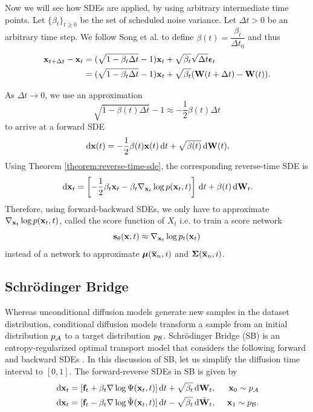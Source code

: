 Now we will see how SDEs are applied, by using arbitrary intermediate time points. Let $\{\beta_t\}_{t\ge0}$ be the set of scheduled noise variance.
Let $\Delta t>0$ be an arbitrary time step. We follow Song et al. \cite{song2020score} to define $\beta(t)=\dfrac{\beta_t}{\Delta t_0}$ and thus
\begin{align*}
 \mathbf{x}_{t+\Delta t}-\mathbf{x}_{t}
  & = (\sqrt{1-\beta_t\Delta t}-1)\mathbf{x}_{t}+\sqrt{\beta_t}\sqrt{\Delta t}\bm{\epsilon}_{t}       \\
  & =(\sqrt{1-\beta_t\Delta t}-1)\mathbf{x}_{t}+\sqrt{\beta_t}(\mathbf{W}(t+\Delta t)-\mathbf{W}(t)).
\end{align*}

As $\Delta t\to 0$, we use an approximation
\begin{equation}
 \sqrt{1-\beta(t)\Delta t} - 1\approx -\dfrac{1}{2}\beta(t)\Delta t
\end{equation}
to arrive at a forward SDE
\begin{equation}
 \label{equation:song-sde}
 \,\mathrm{d} \mathbf{x}(t)=-\dfrac{1}{2}\beta(t)\mathbf{x}(t)\,\mathrm{d} t+\sqrt{\beta(t)}\,\mathrm{d} \mathbf{W}(t).
\end{equation}
Using Theorem \ref{theorem:reverse-time-sde}, the corresponding reverse-time SDE is
\begin{equation}
 \,\mathrm{d} \mathbf{x}_t = \left[-\dfrac{1}{2}\beta_t \mathbf{x}_t-\beta_t\nabla_{\mathbf{x}_t}\log p(\mathbf{x}_t, t)\right]\,\mathrm{d} t + \beta(t)\,\mathrm{d} \mathbf{W}_t.
\end{equation}
Therefore, using forward-backward SDEs, we only have to approximate $\nabla_{\mathbf{x}_t}\log p(\mathbf{x}_t, t)$, called the score function of $X_t$ i.e. to train a score network
$$\mathbf{s}_\theta(\mathbf{x},t) \approx \nabla_{\mathbf{x}_t}\log p_t(\mathbf{x}_t)$$
instead of a network to approximate $\bm{\mu}(\overline{\mathbf{x}}_{n},i)$ and $\bm{\Sigma}(\overline{\mathbf{x}}_{n},i)$.

\subsection{Schrödinger Bridge}
Whereas unconditional diffusion models generate new samples in the dataset distribution, conditional diffusion models transform a sample from an initial distribution $p_{\mathcal{A}}$ to a target distribution $p_{\mathcal{B}}$. Schrödinger Bridge (SB) is an entropy-regularized optimal transport model that considers the following forward and backward SDEs \cite{schrodinger1932theorie}. In this discussion of SB, let us simplify the diffusion time interval to $[0,1]$. The forward-reverse SDEs in SB is given by
\begin{align}
 \label{equation:sb-fw}
 \,\mathrm{d}\mathbf{x}_t & = [\mathbf{f}_t + \beta_t\nabla\log\Psi(\mathbf{x}_t,t)]\,\mathrm{d} t + \sqrt{\beta_t}\,\mathrm{d} \mathbf{W}_t,           & \,\,\, \mathbf{x}_0\sim p_{\mathcal{A}}  \\
 \label{equation:sb-bw}
 \,\mathrm{d}\mathbf{x}_t & = [\mathbf{f}_t - \beta_t\nabla\log\hat{\Psi}(\mathbf{x}_t,t)]\,\mathrm{d} t-\sqrt{\beta_t}\,\mathrm{d} \bar{\mathbf{W}}_t, & \,\,\, \mathbf{x}_1\sim p_{\mathcal{B}}.
\end{align}

